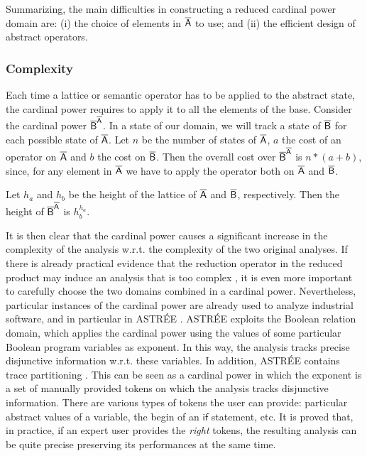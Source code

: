 \documentclass[submission,copyright,creativecommons]{eptcs}
\newcommand{\statement}[1]{\ensuremath{\mathsf{#1}}}
\newcommand{\firstdomain}{\aset{A}}
\newcommand{\seconddomain}{\aset{B}}
\begin{document}
Summarizing, the main difficulties in constructing a reduced cardinal power domain are: (i) the choice of elements in $\firstdomain$ to use; and (ii) the efficient design of abstract operators.

\subsubsection{Complexity}
Each time a lattice or semantic operator has to be applied to the abstract state, the cardinal power requires to apply it to all the elements of the base. Consider the cardinal power $\seconddomain^{\firstdomain}$. In a state of our domain, we will track a state of $\seconddomain$ for each possible state of $\firstdomain$. Let $n$ be the number of states of $\firstdomain$, $a$ the cost of an operator on $\firstdomain$ and $b$ the cost on $\seconddomain$. Then the overall cost over $\seconddomain^{\firstdomain}$ is $n*(a+b)$, since, for any element in $\firstdomain$ we have to apply the operator both on $\firstdomain$ and $\seconddomain$.

Let $h_a$ and $h_b$ be the height of the lattice of $\firstdomain$ and $\seconddomain$, respectively. Then the height of $\seconddomain^{\firstdomain}$ is $h_b^{h_a}$.

It is then clear that the cardinal power causes a significant increase in the complexity of the analysis w.r.t. the complexity of the two original analyses. If there is already practical evidence that the reduction operator in the reduced product may induce an analysis that is too complex \cite{LOG08}, it is even more important to carefully choose the two domains combined in a cardinal power. Nevertheless, particular instances of the cardinal power are already used to analyze industrial software, and in particular in ASTR\'EE \cite{BCC03}. ASTR\'EE exploits the Boolean relation domain, which applies the cardinal power using the values of some particular Boolean program variables as exponent. In this way, the analysis tracks precise disjunctive information w.r.t. these variables. In addition, ASTR\'EE contains trace partitioning \cite{MR05}. This can be seen as a cardinal power in which the exponent is a set of manually provided tokens on which the analysis tracks disjunctive information. There are various types of tokens the user can provide: particular abstract values of a variable, the begin of an \statement{if} statement, etc. It is proved that, in practice, if an expert user provides the \emph{right} tokens, the resulting analysis can be quite precise preserving its performances at the same time.
\end{document}

